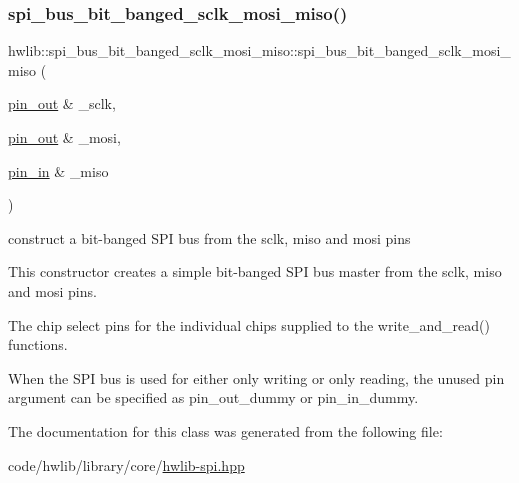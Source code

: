 \subsubsection{\texorpdfstring{spi\+\_\+bus\+\_\+bit\+\_\+banged\+\_\+sclk\+\_\+mosi\+\_\+miso()}{spi\_bus\_bit\_banged\_sclk\_mosi\_miso()}}
{\footnotesize\ttfamily hwlib\+::spi\+\_\+bus\+\_\+bit\+\_\+banged\+\_\+sclk\+\_\+mosi\+\_\+miso\+::spi\+\_\+bus\+\_\+bit\+\_\+banged\+\_\+sclk\+\_\+mosi\+\_\+miso (\begin{DoxyParamCaption}\item[{\hyperlink{classhwlib_1_1pin__out}{pin\+\_\+out} \&}]{\+\_\+sclk,  }\item[{\hyperlink{classhwlib_1_1pin__out}{pin\+\_\+out} \&}]{\+\_\+mosi,  }\item[{\hyperlink{classhwlib_1_1pin__in}{pin\+\_\+in} \&}]{\+\_\+miso }\end{DoxyParamCaption})\hspace{0.3cm}{\ttfamily [inline]}}

construct a bit-\/banged S\+PI bus from the sclk, miso and mosi pins

This constructor creates a simple bit-\/banged S\+PI bus master from the sclk, miso and mosi pins.

The chip select pins for the individual chips supplied to the write\+\_\+and\+\_\+read() functions.

When the S\+PI bus is used for either only writing or only reading, the unused pin argument can be specified as pin\+\_\+out\+\_\+dummy or pin\+\_\+in\+\_\+dummy. 

The documentation for this class was generated from the following file\+:\begin{DoxyCompactItemize}
\item 
code/hwlib/library/core/\hyperlink{hwlib-spi_8hpp}{hwlib-\/spi.\+hpp}\end{DoxyCompactItemize}
